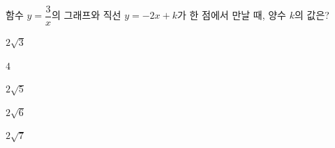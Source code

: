 \hspace*{2mm}\begin{minipage}[t]{\dimexpr\linewidth-2mm\relax}\vspace{0pt}
함수 $y=\dfrac{3}{x}$의 그래프와 직선 $y=-2x+k$가 한 점에서 만날 때, 양수 $k$의 값은?
\begin{choices32}{\rule[-3ex]{0pt}{8ex}$2\sqrt{3}$}{\rule[-3ex]{0pt}{8ex}$4$}{\rule[-3ex]{0pt}{8ex}$2\sqrt{5}$}{\rule[-3ex]{0pt}{8ex}$2\sqrt{6}$}{\rule[-3ex]{0pt}{8ex}$2\sqrt{7}$}\end{choices32}\end{minipage}

